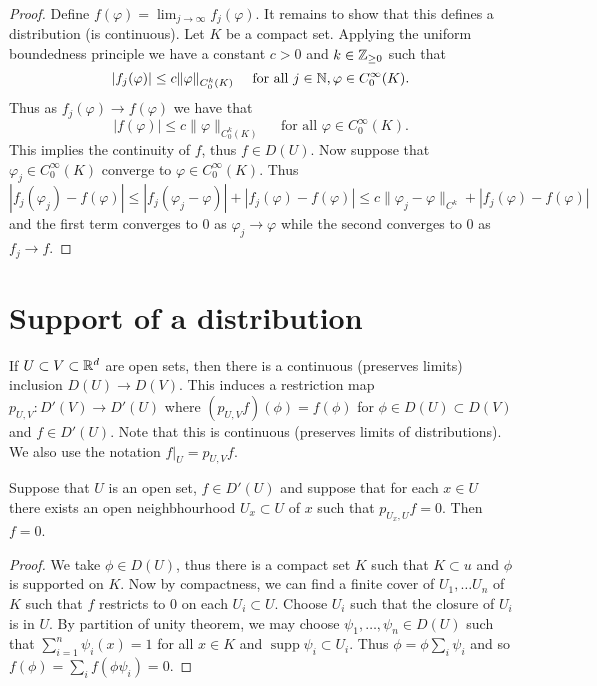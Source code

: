\documentclass[twoside, a4paper, 10pt]{amsart}
\begin{document}
\begin{proof} Define $f(\varphi) = \lim_{j \to \infty} f_j(\varphi)$. It remains to show that this defines a distribution (is continuous). Let $K$ be a compact set. Applying the uniform boundedness principle we have a constant $c>0$ and $k \in \mathbb{Z}_{\geq 0}$ such that $$|f_j(\varphi)| \leq c \| \varphi \|_{C_0^k(K)} \quad \text{ for all } j \in \mathbb{N}, \varphi \in C_0^{\infty}(K).$$ Thus as $f_j(\varphi) \to f(\varphi)$ we have that $$|f(\varphi)| \leq c \| \varphi \|_{C_0^k(K)} \quad \text{ for all } \varphi \in C_0^{\infty}(K).$$ This implies the continuity of $f$, thus $f \in D(U)$. Now suppose that $\varphi_j \in C_0^{\infty}(K)$ converge to $\varphi \in C_0^{\infty}(K)$. Thus $$|f_j(\varphi_j) - f(\varphi)| \leq |f_j(\varphi_j - \varphi)| + |f_j(\varphi) - f(\varphi)| \leq c\|\varphi_j - \varphi\|_{C^k} +  |f_j(\varphi) - f(\varphi)|$$ and the first term converges to $0$ as $\varphi_j \to \varphi$ while the second converges to $0$ as $f_j \to f$.\end{proof}

\section{Support of a distribution}

If $U \subset V \subset \mathbb{R}^d$ are open sets, then there is a continuous (preserves limits) inclusion $D(U) \to D(V)$. This induces a restriction map $p_{U,V}:D'(V) \to D'(U)$ where $(p_{U,V}f)(\phi) = f(\phi)$ for $\phi \in D(U) \subset D(V)$ and $f \in D'(U)$. Note that this is continuous (preserves limits of distributions). We also use the notation $f|_U = p_{U,V}f$.

\begin{lemma} Suppose that $U$ is an open set, $f \in D'(U)$ and suppose that for each $x \in U$ there exists an open neighbhourhood $U_x \subset U$ of $x$ such that $p_{U_x, U} f = 0$. Then $f=0$.

\end{lemma}

\begin{proof} We take $\phi \in D(U)$, thus there is a compact set $K$ such that $K \subset u$ and $\phi$ is supported on $K$. Now by compactness, we can find a finite cover of $U_1, \ldots U_n$ of $K$ such that $f$ restricts to $0$ on each $U_i \subset U$. Choose $U_i$ such that the closure of $U_i$ is in $U$. By partition of unity theorem, we may choose $\psi_1, \ldots, \psi_n \in D(U)$ such that $\sum_{i=1}^n \psi_i (x) = 1$ for all $x \in K$ and $\operatorname{supp} \psi_i \subset U_i$. Thus $\phi = \phi \sum_{i} \psi_i$ and so $f(\phi) = \sum_i f(\phi \psi_i) = 0.$ \end{proof}
\end{document}
